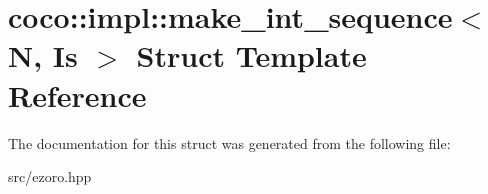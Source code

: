 \hypertarget{structcoco_1_1impl_1_1make__int__sequence}{\section{coco\-:\-:impl\-:\-:make\-\_\-int\-\_\-sequence$<$ N, Is $>$ Struct Template Reference}
\label{structcoco_1_1impl_1_1make__int__sequence}
}


The documentation for this struct was generated from the following file\-:\begin{DoxyCompactItemize}
\item 
src/ezoro.\-hpp\end{DoxyCompactItemize}

